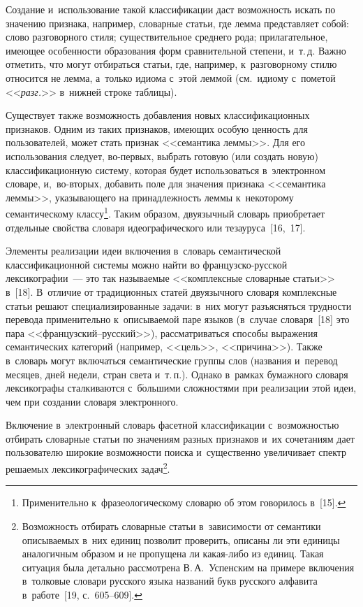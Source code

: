 \begin{multicols}{2}
  Создание и~использование такой классификации даст возможность искать 
по значению признака, например, словарные статьи, где лемма пред\-став\-ля\-ет 
собой: слово разговорного стиля; \mbox{существительное} среднего рода; 
прилагательное, име\-ющее особенности образования форм сравнительной 
степени, и~т.\,д. Важно отметить, что могут отбираться статьи, где, например, 
к~разговорному стилю относится не лемма, а~только идиома с~этой леммой 
(см.\ идиому с~пометой <<\textit{разг.}>> в~нижней строке таблицы).
  
  Существует также возможность добавления новых классификационных 
признаков. Одним из таких признаков, имеющих особую ценность для 
пользователей, может стать признак <<семантика леммы>>. Для его 
использования следует, во-пер\-вых, выбрать готовую (или создать новую) 
классификационную систему, которая будет использоваться в~электронном 
словаре, и,~во-вто\-рых, добавить поле для значения признака <<семантика 
леммы>>, ука\-зы\-ва\-юще\-го на принадлежность леммы к~некоторому семантическому классу\footnote{Применительно 
к~фразеологическому 
словарю об этом говорилось в~[15].}. Таким образом, двуязычный словарь 
приобретает отдельные свойства словаря идеографического или 
тезауруса~[16,~17].
{

}
  
  Элементы реализации идеи включения в~словарь семантической 
классификационной системы можно найти во фран\-цуз\-ско-рус\-ской 
лексикографии~--- это так называемые <<комплексные словарные статьи>> 
в~[18]. В~отличие от традиционных статей двуязычного словаря 
комплексные статьи решают специализированные задачи: в~них могут 
разъясняться трудности перевода применительно к~описываемой паре языков 
(в~случае словаря~[18] это пара <<фран\-цуз\-ский--рус\-ский>>), 
рассматриваться способы выражения семантических категорий (например, 
<<цель>>, <<причина>>). Также в~словарь могут включаться семантические 
группы слов (названия и~перевод месяцев, дней недели, стран света и~т.\,п.). 
Однако в~рамках бумажного словаря лексикографы сталкиваются 
с~б$\acute{\mbox{о}}$льшими сложностями при реализации этой идеи, чем при создании словаря 
электронного.
  
  Включение в~электронный словарь фасетной классификации 
с~возможностью отбирать словарные статьи по значениям разных признаков и~их сочетаниям 
дает пользователю широкие возможности поиска и~существенно увеличивает 
спектр решаемых лексикографических задач\footnote[1]{Возможность отбирать 
словарные статьи в~зависимости от семантики описываемых в~них единиц позволит проверить, 
описаны ли эти единицы аналогичным образом и не пропущена ли ка\-кая-ли\-бо из единиц. 
Такая ситуация была детально рассмотрена В.\,А.~Успенским на 
примере включения в~толковые словари русского языка названий букв 
русского алфавита в~работе~[19, с.~605--609].}.


\end{multicols}
